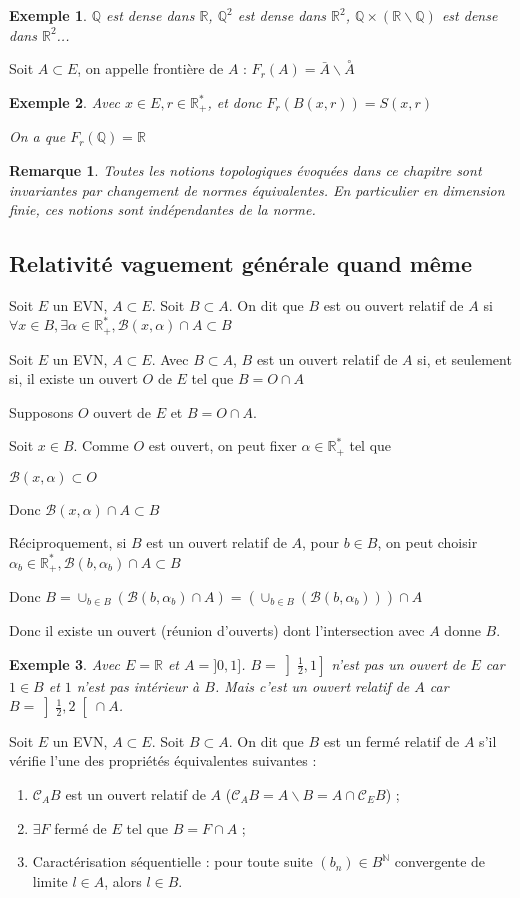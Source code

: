 \documentclass[a4paper,12pt]{book}
\newcommand{\Def}[2]{\begin{tcolorbox}[sharp corners, colback=white,colframe=blue!90!black!75, title=Définition : #1]#2\end{tcolorbox}}
\newcommand{\Prop}[2]{\begin{tcolorbox}[sharp corners, colback=white,colframe=red!90!black!75, title=Proposition : #1]#2\end{tcolorbox}}
\newcommand{\Pre}[1]{\begin{tcolorbox}[sharp corners, colback=white,colframe=green!60!green!30!black!75, title=Preuve]#1\end{tcolorbox}}
\newtheorem{Exe}{Exemple}[section]
\newtheorem{Rem}{Remarque}[section]
\def\R{\mathbb{R}}
\def\Q{\mathbb{Q}}
\def\N{\mathbb{N}}
\begin{document}
\begin{Exe}
$\Q$ est dense dans $\R$, $\Q^2$ est dense dans $\R^2$, $\Q\times (\R\backslash\Q)$ est dense dans $\R^2$...
\end{Exe}
\Def{Frontière}{Soit $A\subset E$, on appelle frontière de $A$ : $F_r(A) = \bar{A}\backslash\overset{\circ}{A}$}
\begin{Exe}
Avec $x\in E,r\in\R_+^*$, et donc $F_r(B(x,r))=S(x,r)$
\par On a que $F_r(\Q)=\R$
\end{Exe}
\begin{Rem}
Toutes les notions topologiques évoquées dans ce chapitre sont invariantes par changement de normes équivalentes. En particulier en dimension finie, ces notions sont indépendantes de la norme.
\end{Rem}
\subsection{Relativité vaguement générale quand même}
\Def{Ouvert relatif}{Soit $E$ un EVN, $A\subset E$. Soit $B\subset A$. On dit que $B$ est ou ouvert relatif de $A$ si $\forall x\in B,\exists\alpha\in\R_+^*,\mathcal{B}(x,\alpha)\cap A\subset B$}
\Prop{Ouvert induit}{Soit $E$ un EVN, $A\subset E$. Avec $B\subset A$, $B$ est un ouvert relatif de $A$ si, et seulement si, il existe un ouvert $O$ de $E$ tel que $B=O\cap A$}
\Pre{Supposons $O$ ouvert de $E$ et $B=O\cap A$. \par Soit $x\in B$. Comme $O$ est ouvert, on peut fixer $\alpha\in\R_+^*$ tel que \par $\mathcal{B}(x,\alpha)\subset O$\par Donc $\mathcal{B}(x,\alpha)\cap A\subset B$
\par Réciproquement, si $B$ est un ouvert relatif de $A$, pour $b\in B$, on peut choisir $\alpha_b\in\R_+^*, \mathcal{B}(b,\alpha_b)\cap A\subset B$ \par Donc $B=\cup_{b\in B}(\mathcal{B}(b,\alpha_b)\cap A)=\left(\cup_{b\in B}(\mathcal{B}(b,\alpha_b))\right)\cap A$ \par Donc il existe un ouvert (réunion d'ouverts) dont l'intersection avec $A$ donne $B$.}
\begin{Exe}
Avec $E=\R$ et $A=]0,1]$. $B=\left]\frac{1}{2},1\right]$ n'est pas un ouvert de $E$ car $1\in B$ et $1$ n'est pas intérieur à $B$. Mais c'est un ouvert relatif de $A$ car $B=\left]\frac{1}{2},2\right[\cap A$.
\end{Exe}
\Def{Fermé relatif}{Soit $E$ un EVN, $A\subset E$. Soit $B\subset A$. On dit que $B$ est un fermé relatif de $A$ s'il vérifie l'une des propriétés équivalentes suivantes :\begin{enumerate}
\item $\mathcal{C}_AB$ est un ouvert relatif de $A$ ($\mathcal{C}_AB=A\backslash B=A\cap\mathcal{C}_EB$) ;
\item $\exists F$ fermé de $E$ tel que $B=F\cap A$ ;
\item Caractérisation séquentielle : pour toute suite $(b_n)\in B^\N$ convergente de limite $l\in A$, alors $l\in B$. \end{enumerate}}
\end{document}
